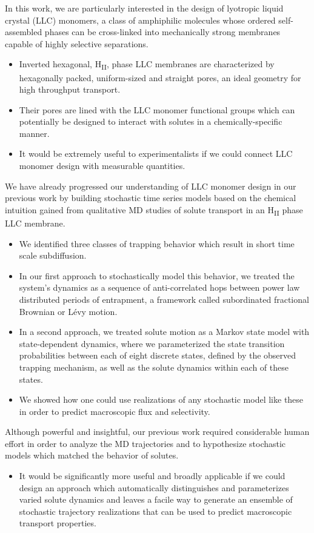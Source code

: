 \documentclass[journal=jpcbfk,manuscript=article]{achemso}
\begin{document}
  In this work, we are particularly interested in the design of lyotropic liquid crystal (LLC)
  monomers, a class of amphiphilic molecules whose ordered self-assembled phases can be 
  cross-linked into mechanically strong membranes capable of highly selective separations.
  \begin{itemize}
  	\item Inverted hexagonal, H\textsubscript{II}, phase LLC membranes are characterized
  	by hexagonally packed, uniform-sized and straight pores, an ideal geometry for high 
  	throughput transport.
	\item Their pores are lined with the LLC monomer functional groups which can
	potentially be designed to interact with solutes in a chemically-specific manner.
	\item It would be extremely useful to experimentalists if we could connect LLC monomer
	design with measurable quantities.
  \end{itemize}
  
  We have already progressed our understanding of LLC monomer design in our previous work
  by building stochastic time series models based on the chemical intuition gained
  from qualitative MD studies of solute transport in an H\textsubscript{II} phase LLC
  membrane.~\cite{coscia_chemically_2019,coscia_capturing_2020}
  \begin{itemize}
    \item We identified three classes of trapping behavior which result in short time scale
    subdiffusion.
    \item In our first approach to stochastically model this behavior, we treated the
    system's dynamics as a sequence of anti-correlated hops between power law distributed
    periods of entrapment, a framework called subordinated fractional Brownian or L\'evy
    motion.
    \item In a second approach, we treated solute motion as a Markov state model with 
    state-dependent dynamics, where we parameterized the state transition probabilities 
    between each of eight discrete states, defined by the observed trapping mechanism, 
    as well as the solute dynamics within each of these states. 
    \item We showed how one could use realizations of any stochastic model like these in
    order to predict macroscopic flux and selectivity. 
  \end{itemize}
  
  Although powerful and insightful, our previous work required considerable human effort
  in order to analyze the MD trajectories and to hypothesize stochastic models which
  matched the behavior of solutes.
  \begin{itemize}
    \item It would be significantly more useful and broadly applicable if we could 
    design an approach which automatically distinguishes and parameterizes varied solute 
    dynamics and leaves a facile way to generate an ensemble of stochastic trajectory
    realizations that can be used to predict macroscopic transport properties.
  \end{itemize}
  
\end{document}
